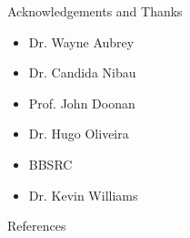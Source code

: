 \documentclass[final]{beamer}
\begin{document}
\begin{frame}{}
\begin{textblock}{28}
\begin{block}{Acknowledgements and Thanks}
      \begin{multicols}{3}

        \begin{itemize}
        \item{Dr. Wayne Aubrey}
        \item{Dr. Candida Nibau}

        \end{itemize}

        \columnbreak

        \begin{itemize}
        \item{Prof. John Doonan}
        \item{Dr. Hugo Oliveira}

        \end{itemize}

        \columnbreak
        
        \begin{itemize}
        \item{BBSRC}
        \item{Dr. Kevin Williams}
        \end{itemize}
        
      \end{multicols}

    \end{block}

    \begin{block}{References}
      
      
    \end{block}

    
  \end{textblock}

\end{frame}
\end{document}
